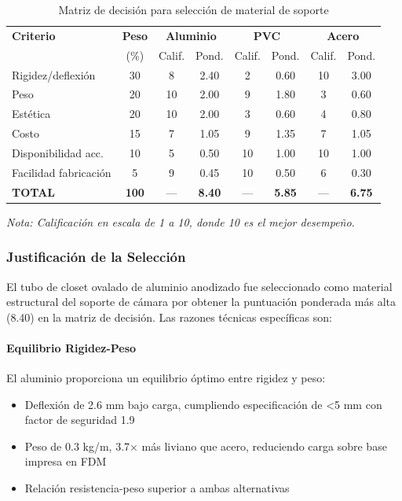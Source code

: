 \begin{table}[H]
\centering
\caption{Matriz de decisión para selección de material de soporte}
\label{tab:matriz_decision_tubos}
\small
\begin{tabular}{|l|c|c|c|c|c|c|c|}
\hline
\textbf{Criterio} & \textbf{Peso} & \multicolumn{2}{c|}{\textbf{Aluminio}} & \multicolumn{2}{c|}{\textbf{PVC}} & \multicolumn{2}{c|}{\textbf{Acero}} \\
 & (\%) & Calif. & Pond. & Calif. & Pond. & Calif. & Pond. \\
\hline
Rigidez/deflexión & 30 & 8 & 2.40 & 2 & 0.60 & 10 & 3.00 \\
Peso & 20 & 10 & 2.00 & 9 & 1.80 & 3 & 0.60 \\
Estética & 20 & 10 & 2.00 & 3 & 0.60 & 4 & 0.80 \\
Costo & 15 & 7 & 1.05 & 9 & 1.35 & 7 & 1.05 \\
Disponibilidad acc. & 10 & 5 & 0.50 & 10 & 1.00 & 10 & 1.00 \\
Facilidad fabricación & 5 & 9 & 0.45 & 10 & 0.50 & 6 & 0.30 \\
\hline
\textbf{TOTAL} & \textbf{100} & --- & \textbf{8.40} & --- & \textbf{5.85} & --- & \textbf{6.75} \\
\hline
\end{tabular}
\end{table}

\textit{Nota: Calificación en escala de 1 a 10, donde 10 es el mejor desempeño.}

\subsubsection{Justificación de la Selección}

El tubo de closet ovalado de aluminio anodizado fue seleccionado como material estructural del soporte de cámara por obtener la puntuación ponderada más alta (8.40) en la matriz de decisión. Las razones técnicas específicas son:

\paragraph{Equilibrio Rigidez-Peso}

El aluminio proporciona un equilibrio óptimo entre rigidez y peso:
\begin{itemize}
    \item Deflexión de 2.6 mm bajo carga, cumpliendo especificación de <5 mm con factor de seguridad 1.9
    \item Peso de 0.3 kg/m, 3.7× más liviano que acero, reduciendo carga sobre base impresa en FDM
    \item Relación resistencia-peso superior a ambas alternativas
\end{itemize}

